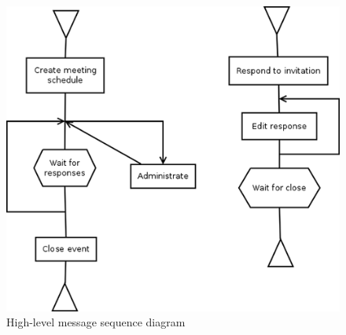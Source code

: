 	\begin{figure}[H]
		\includegraphics{img/hmsc.png}
		\caption{High-level message sequence diagram}
		\label{hmsc:all}
	\end{figure}

